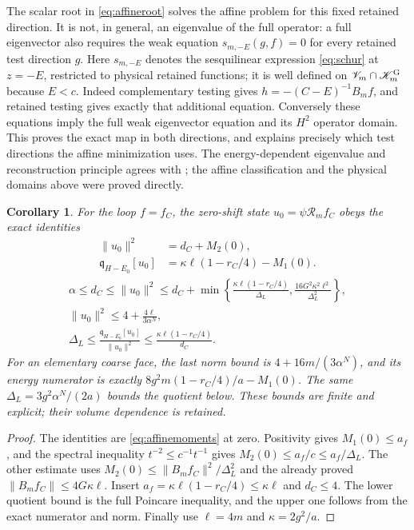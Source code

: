 \documentclass[11pt]{article}
\newtheorem{corollary}[theorem]{Corollary}
\newcommand{\KK}{\mathscr K}
\newcommand{\VV}{\mathscr V}
\begin{document}
The scalar root in \eqref{eq:affineroot} solves the affine problem for
this fixed retained direction. It is not, in general, an eigenvalue of
the full operator: a full eigenvector also requires the weak equation
$s_{m,-E}(g,f)=0$ for every retained test direction $g$.
Here $s_{m,-E}$ denotes the sesquilinear expression
\eqref{eq:schur} at $z=-E$, restricted to physical retained functions;
it is well defined on $\VV_m\cap\KK_m^{\rm G}$ because $E<c$.
Indeed complementary testing gives $h=-(C-E)^{-1}B_mf$, and retained
testing gives exactly that additional equation. Conversely these
equations imply the full weak eigenvector equation and its $H^2$
operator domain. This proves the exact map in both directions, and
explains precisely which test directions the affine minimization uses.
The energy-dependent eigenvalue and reconstruction principle agrees
with \cite[Theorem~1.2 and Corollary~1.3]{DSS}; the affine classification
and the physical domains above were proved directly.

\begin{corollary}\label{cor:zeroloop}
For the loop $f=f_C$, the zero-shift state
$u_0=\psi\mathcal R_m f_C$ obeys the exact identities
\begin{align}
 \|u_0\|^2&=d_C+M_2(0),\nonumber\\
 \mathfrak q_{H-E_0}[u_0]&=\kappa\ell(1-r_C/4)-M_1(0).
 \label{eq:zeroloopactual}
\end{align}
\begin{gather}
 \alpha\leq d_C\leq\|u_0\|^2
 \leq d_C+\min\left\{
       \frac{\kappa\ell(1-r_C/4)}{\Delta_L},
       \frac{16G^2\kappa^2\ell^2}{\Delta_L^2}\right\},
 \label{eq:zeroloopnorm}\\
 \|u_0\|^2\leq4+\frac{4\ell}{3\alpha^N},\nonumber\\
 \Delta_L\leq
 \frac{\mathfrak q_{H-E_0}[u_0]}{\|u_0\|^2}
 \leq\frac{\kappa\ell(1-r_C/4)}{d_C}.\label{eq:zeroloopenergy}
\end{gather}
For an elementary coarse face, the last norm bound is
$4+16m/(3\alpha^N)$, and its energy numerator is exactly
$8g^2m(1-r_C/4)/a-M_1(0)$. The same $\Delta_L=3g^2\alpha^N/(2a)$
bounds the quotient below. These bounds are finite and explicit;
their volume dependence is retained.
\end{corollary}
\begin{proof}
The identities are \eqref{eq:affinemoments} at zero.
Positivity gives $M_1(0)\leq a_f$, and the spectral inequality
$t^{-2}\leq c^{-1}t^{-1}$ gives
$M_2(0)\leq a_f/c\leq a_f/\Delta_L$.
The other estimate uses $M_2(0)\leq\|B_mf_C\|^2/\Delta_L^2$
and the already proved $\|B_mf_C\|\leq4G\kappa\ell$.
Insert $a_f=\kappa\ell(1-r_C/4)\leq\kappa\ell$ and
$d_C\leq4$. The lower quotient bound is the full Poincare inequality,
and the upper one follows from the exact numerator and norm.
Finally use $\ell=4m$ and $\kappa=2g^2/a$.
\end{proof}
\end{document}
